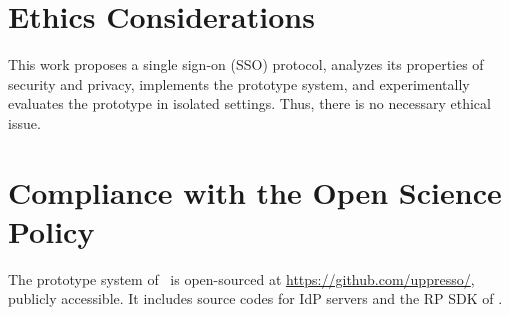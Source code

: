 \section*{Ethics Considerations}
This work proposes a single sign-on (SSO) protocol, analyzes its properties of security and privacy,
    implements the prototype system,
    and experimentally evaluates the prototype in isolated settings.
Thus, there is no necessary ethical issue.

\section*{Compliance with the Open Science Policy}
The prototype system of \usso\ is open-sourced at \url{https://github.com/uppresso/}, publicly accessible.
It includes source codes for IdP servers and the RP SDK of \usso.